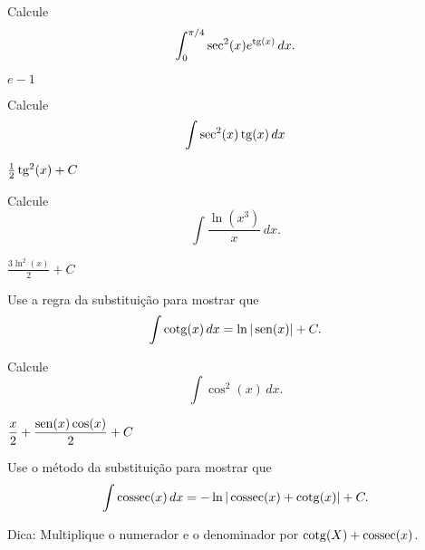 \begin{exer}
  Calcule
  \begin{equation}
    \int_0^{\pi/4} \sec^2(x)e^{\operatorname{tg}(x)}\,dx.
  \end{equation}
\end{exer}
\begin{resp}
  $e-1$
\end{resp}

\begin{exer}
  Calcule
  \begin{equation}
    \int\sec^2(x)\operatorname{tg}(x)\,dx
  \end{equation}
\end{exer}
\begin{resp}
  $\frac{1}{2}\operatorname{tg}^2(x) + C$
\end{resp}

\begin{exer}
  Calcule
  \begin{equation}
    \int \frac{\ln(x^3)}{x}\,dx.
  \end{equation}
\end{exer}
\begin{resp}
  $\displaystyle \frac{3\ln^2(x)}{2} + C$
\end{resp}


\begin{exer}\label{exer:int_subs_cotg}
  Use a regra da substituição para mostrar que
  \begin{equation}
    \int \operatorname{cotg}(x)\,dx = \ln|\operatorname{sen}(x)| + C.
  \end{equation}
\end{exer}

\begin{exer}
  Calcule
  \begin{equation}
    \int \cos^2(x)\,dx.
  \end{equation}
\end{exer}
\begin{resp}
  $\displaystyle \frac{x}{2} + \frac{\operatorname{sen}(x)\cos(x)}{2} + C$
\end{resp}

\begin{exer}\label{exer:int_subs_cossec}
  Use o método da substituição para mostrar que
  \begin{equation}
    \int \operatorname{cossec}(x)\,dx = -\ln|\operatorname{cossec}(x)+\operatorname{cotg}(x)| + C.
  \end{equation}
\end{exer}
\begin{resp}
  Dica: Multiplique o numerador e o denominador por $\operatorname{cotg}(X)+\operatorname{cossec}(x)$.
\end{resp}


